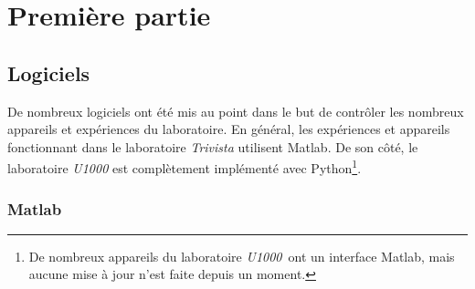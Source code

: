 \documentclass[11pt,francais]{book} %
\begin{document}




\pagestyle{empty} %

\tableofcontents %

\cleardoublepage %

\pagestyle{fancy} %


\part{Première partie}
 


\chapter{Logiciels}

De nombreux logiciels ont été mis au point dans le but de contrôler les nombreux appareils et expériences du laboratoire.
En général, les expériences et appareils fonctionnant dans le laboratoire {\it Trivista} utilisent Matlab.
De son côté, le laboratoire {\it U1000} est complètement implémenté avec Python\footnote{De nombreux appareils du laboratoire {\it U1000}~ont un interface Matlab, mais aucune mise à jour n'est faite depuis un moment.}.

\section{Matlab}%
\end{document}
